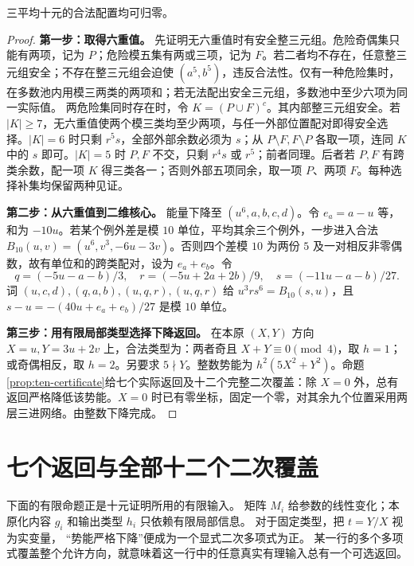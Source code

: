 \begin{lemma}[三平均十元的二次势能下降]\label{lem:ten}
三平均十元的合法配置均可归零。
\end{lemma}
\begin{proof}

\par\noindent\textbf{第一步：取得六重值。}
先证明无六重值时有安全整三元组。危险奇偶集只能有两项，记为 $P$；危险模五集有两或三项，记为 $F$。若二者均不存在，任意整三元组安全；不存在整三元组会迫使 $(a^5,b^5)$，违反合法性。仅有一种危险集时，在多数池内用模三两类的两项和；若无法配出安全三元组，多数池中至少六项为同一实际值。
两危险集同时存在时，令 $K=(P\cup F)^c$。其内部整三元组安全。若 $|K|\ge7$，无六重值使两个模三类均至少两项，与任一外部位置配对即得安全选择。$|K|=6$ 时只剩 $r^5s$，全部外部余数必须为 $s$；从 $P\setminus F,F\setminus P$ 各取一项，连同 $K$ 中的 $s$ 即可。$|K|=5$ 时 $P,F$ 不交，只剩 $r^4s$ 或 $r^5$；前者同理。后者若 $P,F$ 有跨类余数，配一项 $K$ 得三类各一；否则外部五项同余，取一项 $P$、两项 $F$。每种选择补集均保留两种见证。


\par\noindent\textbf{第二步：从六重值到二维核心。}
能量下降至 $(u^6,a,b,c,d)$。令 $e_a=a-u$ 等，和为 $-10u$。若某个例外差是模 $10$ 单位，平均其余三个例外，一步进入合法 $B_{10}(u,v)=(u^6,v^3,-6u-3v)$。否则四个差模 $10$ 为两份 $5$ 及一对相反非零偶数，故有单位和的跨类配对，设为 $e_a+e_b$。令
\[q=(-5u-a-b)/3,\quad r=(-5u+2a+2b)/9,\quad s=(-11u-a-b)/27.
\]
词 $(u,c,d),(q,a,b),(u,q,r),(u,q,r)$ 给 $u^3r s^6=B_{10}(s,u)$，且 $s-u=-(40u+e_a+e_b)/27$ 是模 $10$ 单位。


\par\noindent\textbf{第三步：用有限局部类型选择下降返回。}
在本原 $(X,Y)$ 方向 $X=u,Y=3u+2v$ 上，合法类型为：两者奇且 $X+Y\equiv0\pmod4$，取 $h=1$；或奇偶相反，取 $h=2$。另要求 $5\nmid Y$。整数势能为 $h^2(5X^2+Y^2)$。命题\ref{prop:ten-certificate}给七个实际返回及十二个完整二次覆盖：除 $X=0$ 外，总有返回严格降低该势能。$X=0$ 时已有零坐标，固定一个零，对其余九个位置采用两层三进网络。由整数下降完成。
\end{proof}



\section{七个返回与全部十二个二次覆盖}
下面的有限命题正是十元证明所用的有限输入。
矩阵 $M_i$ 给参数的线性变化；本原化内容 $g_i$ 和输出类型 $h_i$ 只依赖有限局部信息。
对于固定类型，把 $t=Y/X$ 视为实变量，
“势能严格下降”便成为一个显式二次多项式为正。
某一行的多个多项式覆盖整个允许方向，就意味着这一行中的任意真实有理输入总有一个可选返回。


